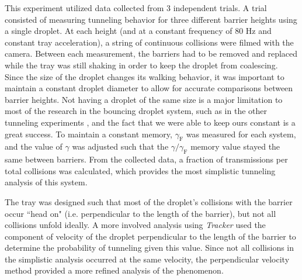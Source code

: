 This experiment utilized data collected from 3 independent trials. A trial consisted of measuring tunneling behavior for three different barrier heights using a single droplet. At each height (and at a constant frequency of 80 Hz and constant tray acceleration), a string of continuous collisions were filmed with the camera. Between each measurement, the barriers had to be removed and replaced while the tray was still shaking in order to keep the droplet from coalescing. Since the size of the droplet changes its walking behavior, it was important to maintain a constant droplet diameter to allow for accurate comparisons between barrier heights. Not having a droplet of the same size is a major limitation to most of the research in the bouncing droplet system, such as in the other tunneling experiments \cite{tunneling}, and the fact that we were able to keep ours constant is a great success. To maintain a constant memory, $\gamma_\mathrm{F}$ was measured for each system, and the value of $\gamma$ was adjusted such that the $\gamma/\gamma_\mathrm{F}$ memory value stayed the same between barriers. From the collected data, a fraction of transmissions per total collisions was calculated, which provides the most simplistic tunneling analysis of this system. 

The tray was designed such that most of the droplet's collisions with the barrier occur ``head on" (i.e. perpendicular to the length of the barrier), but not all collisions unfold ideally. A more involved analysis using \textit{Tracker} used the component of velocity of the droplet perpendicular to the length of the barrier to determine the probability of tunneling given this value. Since not all collisions in the simplistic analysis occurred at the same velocity, the perpendicular velocity method provided a more refined analysis of the phenomenon. 
